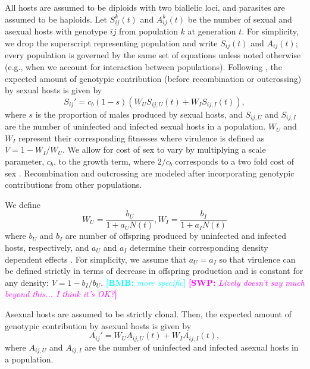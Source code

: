 \documentclass{article}\usepackage[]{graphicx}\usepackage[]{color}
\newcommand{\comment}[3]{\textcolor{#1}{\textbf{[#2: }\textit{#3}\textbf{]}}}
\newcommand{\bmb}[1]{\comment{cyan}{BMB}{#1}}
\newcommand{\swp}[1]{\comment{magenta}{SWP}{#1}}
\begin{document}
All hosts are assumed to be diploids with two biallelic loci, and parasites are assumed to be haploids.
Let $S_{ij}^k(t)$ and $A_{ij}^k(t)$ be the number of sexual and asexual hosts with genotype $ij$ from population $k$ at generation $t$. 
For simplicity, we drop the superscript representing population and write $S_{ij}(t)$ and $A_{ij}(t)$;
every population is governed by the same set of equations unless noted otherwise (e.g., when we account for interaction between populations).
Following \cite{lively2010epidemiological}, the expected amount of genotypic contribution (before recombination or outcrossing) by sexual hosts is given by
\begin{equation}
S_{ij}' = c_b (1-s) \left(W_U S_{ij,U} (t) + W_I S_{ij,I} (t)\right),
\end{equation}
where $s$ is the proportion of males produced by sexual hosts, and $S_{ij, U}$ and $S_{ij,I}$ are the number of uninfected and infected sexual hosts in a population.
$W_U$ and $W_I$ represent their corresponding fitnesses where virulence is defined as $V = 1-W_I/W_U$.
We allow for cost of sex to vary by multiplying a scale parameter, $c_b$, to the growth term, where $2/c_b$ corresponds to a two fold cost of sex \citep{ashby2015diversity}.
Recombination and outcrossing are modeled after incorporating genotypic contributions from other populations.

We define
$$
W_U = \frac{b_U}{1 + a_U N(t)}, W_I = \frac{b_I}{1 + a_I N(t)}
$$
where $b_U$ and $b_I$ are number of offspring produced by uninfected and infected hosts, respectively, and $a_U$ and $a_I$ determine their corresponding density dependent effects \citep{lively2010epidemiological, smith1973stability}.
For simplicity, we assume that $a_U = a_I$ so that virulence can be defined strictly in terms of decrease in offspring production and is constant for any density: $V = 1- b_I/b_U$.
\bmb{more specific}
\swp{Lively doesn't say much beyond this... I think it's OK?}

Asexual hosts are assumed to be strictly clonal. Then, the expected amount of genotypic contribution by asexual hosts is given by
\begin{equation}
A_{ij}' = W_U A_{ij,U} (t) + W_I A_{ij,I} (t),
\end{equation}
where $A_{ij, U}$ and $A_{ij,I}$ are the number of uninfected and infected asexual hosts in a population.
\end{document}
